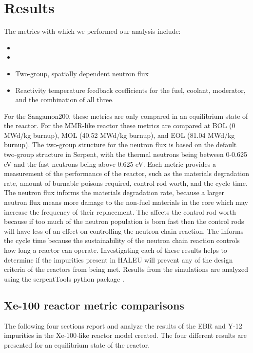 \section{Results}
The metrics with which we performed our analysis include:
\begin{itemize} 
        \item \keff 
        \item \betaEff
        \item Two-group, spatially dependent neutron flux
        \item Reactivity temperature feedback coefficients for the fuel, coolant, 
              moderator, and the combination of all three.
\end{itemize}

For the Sangamon200, these metrics are only compared in an equilibrium state
of the reactor. For the \gls{MMR}-like reactor these metrics 
are compared at \gls{BOL} (0 MWd/kg burnup), \gls{MOL} (40.52 MWd/kg burnup), 
and \gls{EOL} (81.04 MWd/kg burnup). The two-group structure for 
the neutron flux is based on the default two-group structure in Serpent, 
with the thermal neutrons being between 0-0.625 eV and the fast 
neutrons being above 0.625 eV. Each metric provides a 
measurement of the performance of 
the reactor, such as the materials degradation rate, amount of burnable 
poisons required, control rod worth, and the cycle time. The neutron flux 
informs the materials degradation rate, because a larger neutron flux 
means more damage to the non-fuel materials in the core which may increase 
the frequency of their replacement. The \betaEff affects the control rod 
worth because if too much of the neutron population is born fast then 
the control rods will have less of an effect on controlling the neutron 
chain reaction. The \keff informs the cycle time because the sustainability 
of the neutron chain reaction controls how long a reactor can operate. 
Investigating 
each of these results helps to determine if the impurities 
present in \gls{HALEU} will prevent any of the design criteria of the 
reactors from being met. Results from the simulations are analyzed using 
the serpentTools python package \cite{johnson_serpenttools_2020}. 

\subsection{Xe-100 reactor metric comparisons}
The following four sections report and analyze the results of the 
\gls{EBR} and Y-12 impurities in the Xe-100-like reactor model 
created. The four different results are presented for an 
equilibrium state of the reactor.

